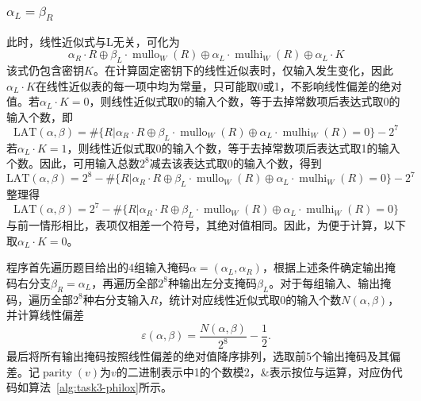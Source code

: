\subsubsection{$\alpha_L = \beta_R$}
此时，线性近似式与L无关，可化为
\[
\alpha_R\cdot R
\oplus\beta_L\cdot\operatorname{mullo}_W(R)
\oplus\alpha_L\cdot\operatorname{mulhi}_W(R)
\oplus\alpha_L\cdot K
\]
该式仍包含密钥$K$。在计算固定密钥下的线性近似表时，仅输入发生变化，因此$\alpha_L\cdot K$在线性近似表的每一项中均为常量，只可能取0或1，不影响线性偏差的绝对值。若$\alpha_L\cdot K = 0$，则线性近似式取0的输入个数，等于去掉常数项后表达式取0的输入个数，即
$$\text{LAT}(\alpha,\beta)= \#\{R|\alpha_R\cdot R
\oplus\beta_L\cdot\operatorname{mullo}_W(R)
\oplus\alpha_L\cdot\operatorname{mulhi}_W(R) = 0\}  - 2^7$$
若$\alpha_L\cdot K = 1$，则线性近似式取0的输入个数，等于去掉常数项后表达式取1的输入个数。因此，可用输入总数$2^8$减去该表达式取0的输入个数，得到
$$\text{LAT}(\alpha,\beta)= 2^8 - \#\{R|\alpha_R\cdot R
\oplus\beta_L\cdot\operatorname{mullo}_W(R)
\oplus\alpha_L\cdot\operatorname{mulhi}_W(R) = 0\} - 2^7$$
整理得$$\text{LAT}(\alpha,\beta)= 2^7 - \#\{R|\alpha_R\cdot R
\oplus\beta_L\cdot\operatorname{mullo}_W(R)
\oplus\alpha_L\cdot\operatorname{mulhi}_W(R) = 0\}$$
与前一情形相比，表项仅相差一个符号，其绝对值相同。因此，为便于计算，以下取$\alpha_L\cdot K = 0$。

程序首先遍历题目给出的4组输入掩码$\alpha=(\alpha_L,\alpha_R)$，根据上述条件确定输出掩码右分支$\beta_R=\alpha_L$，再遍历全部$2^8$种输出左分支掩码$\beta_L$。对于每组输入、输出掩码，遍历全部$2^8$种右分支输入$R$，统计对应线性近似式取0的输入个数$N(\alpha,\beta)$，并计算线性偏差
\[
\varepsilon(\alpha,\beta)
=\frac{N(\alpha,\beta)}{2^8}-\frac12.
\]
最后将所有输出掩码按照线性偏差的绝对值降序排列，选取前5个输出掩码及其偏差。记$\operatorname{parity}(v)$为$v$的二进制表示中1的个数模2，\&表示按位与运算，对应伪代码如算法~\ref{alg:task3-philox}所示。

